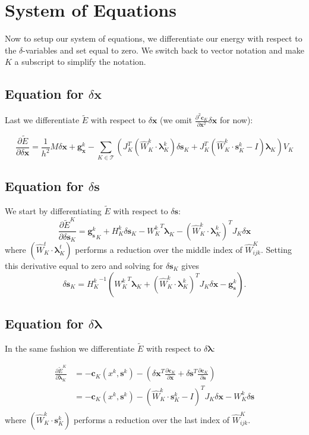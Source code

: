 \documentclass[letterpaper,12pt]{article}
\theoremstyle{remark}
\newcommand{\Th}{\mathcal{T}}
\newcommand{\x}{\mathbf{x}}
\newcommand{\C}{\mathbf{c}}
\newcommand{\s}{\mathbf{s}}
\newcommand{\la}{\mathbf{\lambda}}
\newcommand{\dx}{\delta \x}
\newcommand{\ds}{\delta \s}
\newcommand{\dl}{\delta \la}
\newcommand{\gx}{ {\mathbf{g}_\x^k} }
\newcommand{\gs}{ {\mathbf{g}_\s^k} }
\begin{document}
\section{System of Equations}
Now to setup our system of equations, we differentiate our energy with respect to the $\delta$-variables and set equal to zero. We switch back to vector notation and make $K$ a subscript to simplify the notation.


\subsection{Equation for $\dx$}
Last we differentiate $\tilde{E}$ with respect to $\dx$ (we omit $\frac{\partial^2 \C_K}{ \partial \x^2} \dx$ for now):

\begin{equation}
\frac{\partial \tilde{E}}{\partial \dx} = \frac{1}{h^2}M\dx + \gx 
- \sum_{K \in \Th} \left(
J_K^T(\hat{W}_K^{k}\cdot \la_K^k) \ds_K +
J_K^T(\hat{W}_K^{k}\cdot \s_K^k - I)\la_K
\right)V_K
\end{equation}


\subsection{Equation for $\ds$}
We start by differentiating $\tilde{E}$ with respect to $\ds$:
\begin{equation}
\frac{\partial \tilde{E}^K}{\partial \ds_K} =  \gs_K + H_K^k \ds_K -
{W_K^k}^T \la_K - (\hat{W}_K^{k}\cdot \la_K^k)^T J_K \dx
\end{equation}
where $(\hat{W}_K^{t}\cdot \la_K^t)$ performs a reduction over the middle index of $\hat{W}^K_{ijk}$. Setting this derivative equal to zero and solving for $\ds_K$ gives
\begin{equation}
\ds_K = {H_K^k}^{-1} \left( {W_K^k}^T \la_K + (\hat{W}_K^{k}\cdot \la_K^k)^T J_K \dx - \gs \right).
\end{equation}

\subsection{Equation for $\dl$}
In the same fashion we differentiate $\tilde{E}$ with respect to $\dl$:

\begin{equation}
\begin{split}
\frac{\partial \tilde{E}^K}{\partial \la_K} &= -\C_K (x^k,\s^k)- \left( \dx^T 
  \frac{\partial \C_K }{\partial \x} +  \ds^T \frac{\partial \C_K }{\partial \s} \right) \\
  &= -\C_K (x^k,\s^k) -(\hat{W}_K^{k}\cdot \s_K^k - I)^T J_K \dx - W_K^k \ds\\
\end{split}
\end{equation}
where $(\hat{W}_K^{k}\cdot \s_K^k)$ performs a reduction over the last index of $\hat{W}^K_{ijk}$.
\end{document}
